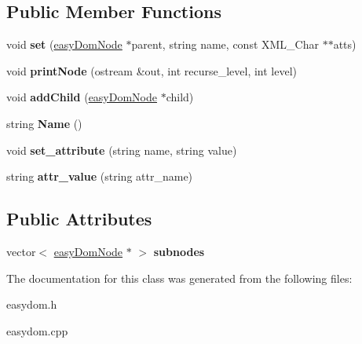 \subsection*{Public Member Functions}
\begin{DoxyCompactItemize}
\item 
void {\bfseries set} (\hyperlink{classeasyDomNode}{easy\+Dom\+Node} $\ast$parent, string name, const X\+M\+L\+\_\+\+Char $\ast$$\ast$atts)\hypertarget{classeasyDomNode_a9159f38bf4e3425451471282b36720f5}{}\label{classeasyDomNode_a9159f38bf4e3425451471282b36720f5}

\item 
void {\bfseries print\+Node} (ostream \&out, int recurse\+\_\+level, int level)\hypertarget{classeasyDomNode_aabeaf20125e3ade5c758634d4398ad17}{}\label{classeasyDomNode_aabeaf20125e3ade5c758634d4398ad17}

\item 
void {\bfseries add\+Child} (\hyperlink{classeasyDomNode}{easy\+Dom\+Node} $\ast$child)\hypertarget{classeasyDomNode_a0edd06c911e3544f78aa424e8c734a5d}{}\label{classeasyDomNode_a0edd06c911e3544f78aa424e8c734a5d}

\item 
string {\bfseries Name} ()\hypertarget{classeasyDomNode_a7cb692bf3949ee776387c3607fb2912c}{}\label{classeasyDomNode_a7cb692bf3949ee776387c3607fb2912c}

\item 
void {\bfseries set\+\_\+attribute} (string name, string value)\hypertarget{classeasyDomNode_a4bae9cd70dcd0962aba8e6ad42162571}{}\label{classeasyDomNode_a4bae9cd70dcd0962aba8e6ad42162571}

\item 
string {\bfseries attr\+\_\+value} (string attr\+\_\+name)\hypertarget{classeasyDomNode_a3be754c62d5ae17c6f47366aa68e6991}{}\label{classeasyDomNode_a3be754c62d5ae17c6f47366aa68e6991}

\end{DoxyCompactItemize}
\subsection*{Public Attributes}
\begin{DoxyCompactItemize}
\item 
vector$<$ \hyperlink{classeasyDomNode}{easy\+Dom\+Node} $\ast$ $>$ {\bfseries subnodes}\hypertarget{classeasyDomNode_a780bf5c01c6a9a5831e0e219f8a8a580}{}\label{classeasyDomNode_a780bf5c01c6a9a5831e0e219f8a8a580}

\end{DoxyCompactItemize}


The documentation for this class was generated from the following files\+:\begin{DoxyCompactItemize}
\item 
easydom.\+h\item 
easydom.\+cpp\end{DoxyCompactItemize}

